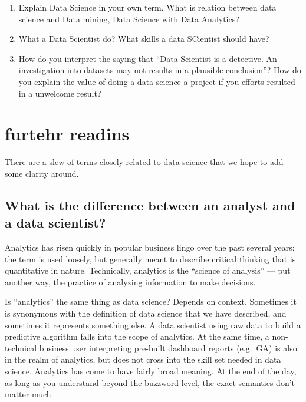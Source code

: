 \documentclass[
]{book}
\providecommand{\tightlist}{%
  \setlength{\itemsep}{0pt}\setlength{\parskip}{0pt}}
\begin{document}
\begin{enumerate}
\def\labelenumi{\arabic{enumi}.}
\tightlist
\item
  Explain Data Science in your own term. What is relation between data science and Data mining, Data Science with Data Analytics?
\item
  What a Data Scientist do? What skills a data SCientist should have?
\item
  How do you interpret the saying that ``Data Scientist is a detective. An investigation into datasets may not results in a plausible conclusion''? How do you explain the value of doing a data science a project if you efforts resulted in a unwelcome result?
\end{enumerate}

\hypertarget{furtehr-readins}{%
\section{furtehr readins}\label{furtehr-readins}}

There are a slew of terms closely related to data science that we hope to add some clarity around.

\hypertarget{what-is-the-difference-between-an-analyst-and-a-data-scientist}{%
\subsection{What is the difference between an analyst and a data scientist?}\label{what-is-the-difference-between-an-analyst-and-a-data-scientist}}

Analytics has risen quickly in popular business lingo over the past several years; the term is used loosely, but generally meant to describe critical thinking that is quantitative in nature. Technically, analytics is the ``science of analysis'' --- put another way, the practice of analyzing information to make decisions.

Is ``analytics'' the same thing as data science? Depends on context. Sometimes it is synonymous with the definition of data science that we have described, and sometimes it represents something else. A data scientist using raw data to build a predictive algorithm falls into the scope of analytics. At the same time, a non-technical business user interpreting pre-built dashboard reports (e.g.~GA) is also in the realm of analytics, but does not cross into the skill set needed in data science. Analytics has come to have fairly broad meaning. At the end of the day, as long as you understand beyond the buzzword level, the exact semantics don't matter much.
\end{document}
